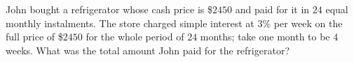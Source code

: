 John bought a refrigerator whose cash price is \$$2450$ and paid for it in $24$ equal monthly instalments. The store charged simple interest at $3\%$ per week on the full price of \$$2450$ for the whole period of $24$ months; take one month to be $4$ weeks. What was the total amount John paid for the refrigerator?
